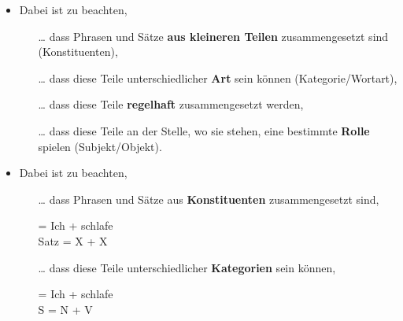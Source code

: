 \begin{frame}

\begin{itemize}

	\item Dabei ist zu beachten,
	
	\begin{itemize}
		\item[\dots] dass Phrasen und Sätze \textbf{aus kleineren Teilen} zusammengesetzt sind (Konstituenten),
		\item[]
		\item [\dots] dass diese Teile unterschiedlicher \textbf{Art} sein können (Kategorie/Wortart),
		\item[]
		\item [\dots] dass diese Teile \textbf{regelhaft} zusammengesetzt werden,
		\item[]
		\item[\dots] dass diese Teile an der Stelle, wo sie stehen, eine bestimmte \textbf{Rolle} spielen (Subjekt/Objekt).
 		
	\end{itemize}
	
\end{itemize}

\end{frame}


\begin{frame}

\begin{itemize}
\item Dabei ist zu beachten, 

\begin{itemize}
	\item [\dots] dass Phrasen und Sätze aus \textbf{Konstituenten} zusammengesetzt sind,

	\ea
	 = Ich + schlafe\\
	Satz = X + X \\
	\z

\pause

	\item [\dots] dass diese Teile unterschiedlicher \textbf{Kategorien} sein können,

	\ea 
	 = Ich + schlafe\\
	S = N + V \\
	\z

\end{itemize}

\end{itemize}

\end{frame}


